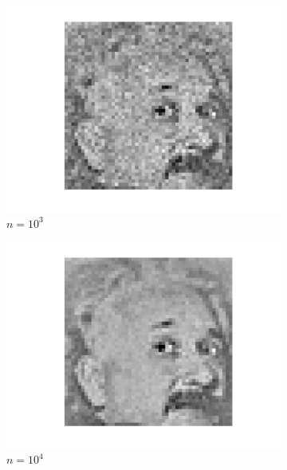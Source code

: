 \documentclass[english,11pt]{article}
\numberwithin{equation}{section}
\theoremstyle{plain}
\theoremstyle{definition}
\theoremstyle{remark}
\theoremstyle{plain}
\theoremstyle{remark}
\theoremstyle{plain}
\theoremstyle{plain}
\begin{document}
\begin{figure}[h!]
	\begin{subfigure}[h]{0.3\textwidth}
	\centering
	\includegraphics[scale=0.3]{Einstein_from_noise_n1000}
	\caption{$n = 10^3$}
\end{subfigure}%
\begin{subfigure}[h]{0.3\textwidth}
	\centering
	\includegraphics[scale=0.3]{Einstein_from_noise_n10000}
	\caption{$n = 10^4$}
\end{subfigure}
\begin{subfigure}[h]{0.3\textwidth}
	\centering

\end{subfigure}
\end{figure}
\end{document}
